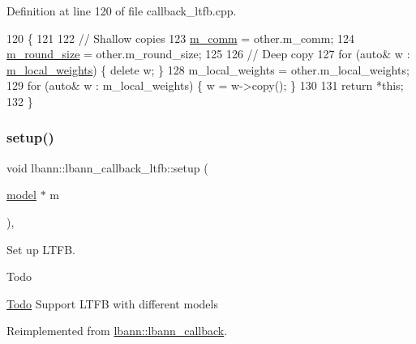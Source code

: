 Definition at line 120 of file callback\+\_\+ltfb.\+cpp.


\begin{DoxyCode}
120                                                                                     \{
121 
122   \textcolor{comment}{// Shallow copies}
123   \hyperlink{classlbann_1_1lbann__callback__ltfb_a7536bb519c8a89b518a3196f953ac048}{m\_comm} = other.m\_comm;
124   \hyperlink{classlbann_1_1lbann__callback__ltfb_a78434b8e8b1dfa43a68a9707473cf789}{m\_round\_size} = other.m\_round\_size;
125 
126   \textcolor{comment}{// Deep copy}
127   \textcolor{keywordflow}{for} (\textcolor{keyword}{auto}& w : \hyperlink{classlbann_1_1lbann__callback__ltfb_a5e5b9917b9eee67b8e14c6e8f95a85a3}{m\_local\_weights}) \{ \textcolor{keyword}{delete} w; \}
128   m\_local\_weights = other.m\_local\_weights;
129   \textcolor{keywordflow}{for} (\textcolor{keyword}{auto}& w : m\_local\_weights) \{ w = w->copy(); \}
130 
131   \textcolor{keywordflow}{return} *\textcolor{keyword}{this};
132 \}
\end{DoxyCode}
\mbox{\label{classlbann_1_1lbann__callback__ltfb_a7548166d170eda00e4e0cba6626a1a78}} 
\subsubsection{\texorpdfstring{setup()}{setup()}}
{\footnotesize\ttfamily void lbann\+::lbann\+\_\+callback\+\_\+ltfb\+::setup (\begin{DoxyParamCaption}\item[{\hyperlink{classlbann_1_1model}{model} $\ast$}]{m }\end{DoxyParamCaption})\hspace{0.3cm}{\ttfamily [override]}, {\ttfamily [virtual]}}

Set up L\+T\+FB. \begin{DoxyRefDesc}{Todo}
\item[\hyperlink{todo__todo000002}{Todo}]Support L\+T\+FB with different models \end{DoxyRefDesc}


Reimplemented from \hyperlink{classlbann_1_1lbann__callback_aab5086e27d9bb0a7c7ee8ffc1bc58671}{lbann\+::lbann\+\_\+callback}.



